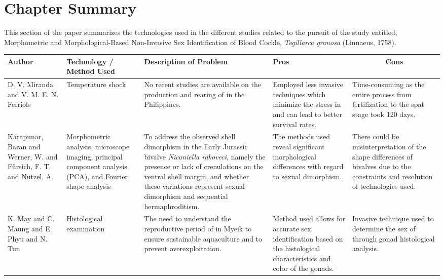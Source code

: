 {\section{Chapter Summary}
This section of the paper summarizes the technologies used in the different studies related to the pursuit of the study entitled, Morphometric and Morphological-Based Non-Invasive Sex Identification of Blood Cockle, \textit{Tegillarca granosa} (Linnaeus, 1758).

\begin{table}[]
	\centering
	\renewcommand{\arraystretch}{3} 
	\begin{adjustbox}{scale=0.55,center}
		\normalsize
		\begin{tabular}{|p{5cm}|p{5cm}|p{8cm}|p{8cm}|p{8cm}|}
			\hline
			\centering
			\textbf{Author} &
			\centering
			\textbf{Technology / Method Used} &
			\centering
			\textbf{Description of Problem} &
			\centering
			\textbf{Pros} &
			\multicolumn{1}{c|}{\textbf{Cons}} \\ \hline
			
			D. V. Miranda and V. M. E. N. Ferriols &
			Temperature shock &
			No recent studies are available on the production and rearing of \textit{\Tgranosa} in the Philippines. &
			Employed less invasive techniques which minimize the stress in \textit{\Tgranosa} and can lead to better survival rates. &
			Time-consuming as the entire process from fertilization to the spat stage took 120 days. \\ \hline
			
			Karapunar, Baran and Werner, W. and Fürsich, F. T. and Nützel, A. &
			Morphometric analysis, microscope imaging, principal component analysis (PCA), and Fourier shape analysis &
			To address the observed shell dimorphism in the Early Jurassic bivalve \textit{Nicaniella rakoveci}, namely the presence or lack of crenulations on the ventral shell margin, and whether these variations represent sexual dimorphism and sequential hermaphroditism. &
			The methods used reveal significant morphological differences with regard to sexual dimorphism. &
			There could be misinterpretation of the shape differences of bivalves due to the constraints and resolution of technologies used. \\ \hline
			
			K. May and C. Maung and E. Phyu and N. Tun &
			Histological examination &
			The need to understand the reproductive period of \textit{\Tgranosa} in Myeik to ensure sustainable aquaculture and to prevent overexploitation. &
			Method used allows for accurate sex identification based on the histological characteristics and color of the gonads. &
			Invasive technique used to determine the sex of \textit{\Tgranosa} through gonad histological analysis. \\ \hline
			

\end{tabular}
\end{adjustbox}
\end{table}}
